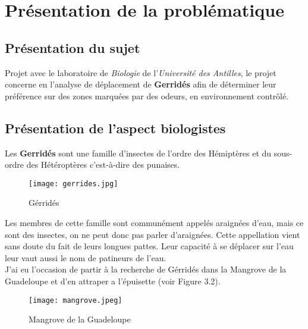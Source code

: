 \chapter{Présentation de la problématique}
    \section{Présentation du sujet}
    Projet avec le laboratoire de \textit{Biologie} de l'\textit{Université des Antilles}, le projet concerne en l'analyse de déplacement de \textbf{Gerridés} afin de déterminer leur préférence sur des zones marquées par des odeurs, en environnement contrôlé.


    \section{Présentation de l'aspect biologistes}
    Les \textbf{Gerridés} sont une famille d'insectes de l'ordre des Hémiptères et du sous-ordre des Hétéroptères c'est-à-dire des punaises.
    \begin{figure}[ht]
        \centering
        \texttt{[image: gerrides.jpg]}
        \caption{Gérridés}        
    \end{figure}

    \vspace{0.1cm}

    \begin{flushleft}
        Les membres de cette famille sont communément appelés araignées d’eau, mais ce sont des insectes, on ne peut donc pas parler d'araignées. Cette appellation vient sans doute du fait de leurs longues pattes. Leur capacité à se déplacer sur l'eau leur vaut aussi le nom de patineurs de l'eau.\\[0.1cm]
        
        J'ai eu l'occasion de partir à la recherche de Gérridés dans la Mangrove de la Guadeloupe et d'en attraper a l'épuisette (voir Figure 3.2).

        \begin{figure}[ht]
            \centering
            \texttt{[image: mangrove.jpeg]}
            \caption{Mangrove de la Guadeloupe}
        \end{figure}


    \end{flushleft}

    \vspace{0.2cm}

